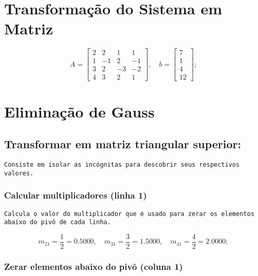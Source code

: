 \documentclass[12pt]{article}
\begin{document}
    \section{Transformação do Sistema em Matriz}

        \[
        A = \begin{bmatrix}
            2 & 2 & 1 & 1 \\
            1 & -1 & 2 & -1 \\
            3 & 2 & -3 & - 2\\
            4 & 3 & 2 & 1
        \end{bmatrix}, \quad
        b = \begin{bmatrix}
            7 \\ 1 \\ 4 \\ 12
        \end{bmatrix};
        \]

    \section{Eliminação de Gauss}
        \subsection{Transformar em matriz triangular superior:}

            \texttt{Consiste em isolar as incógnitas para descobrir seus respectivos valores.}

            \subsubsection{Calcular multiplicadores (linha 1)}

                \texttt{Calcula o valor do multiplicador que é usado para zerar os elementos abaixo do pivô de cada linha.}

                \[
                m_{21} = \frac{1}{2} = 0.5000, \quad m_{31} = \frac{3}{2} = 1.5000, \quad m_{41} = \frac{4}{2} = 2.0000;
                \]

            \subsubsection{Zerar elementos abaixo do pivô (coluna 1)}
\end{document}
